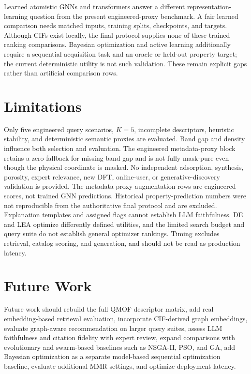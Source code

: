 \documentclass[12pt,a4paper]{article}
\begin{document}
Learned atomistic GNNs and transformers answer a different representation-learning question from the present engineered-proxy benchmark. A fair learned comparison needs matched inputs, training splits, checkpoints, and targets. Although CIFs exist locally, the final protocol supplies none of these trained ranking comparisons. Bayesian optimization and active learning additionally require a sequential acquisition task and an oracle or held-out property target; the current deterministic utility is not such validation. These remain explicit gaps rather than artificial comparison rows.

\section{Limitations}
\label{sec:limitations}

Only five engineered query scenarios, $K=5$, incomplete descriptors, heuristic stability, and deterministic semantic proxies are evaluated. Band gap and density influence both selection and evaluation. The engineered metadata-proxy block retains a zero fallback for missing band gap and is not fully mask-pure even though the physical coordinate is masked. No independent adsorption, synthesis, porosity, expert relevance, new DFT, online-user, or generative-discovery validation is provided. The metadata-proxy augmentation rows are engineered scores, not trained GNN predictions. Historical property-prediction numbers were not reproducible from the authoritative final protocol and are excluded. Explanation templates and assigned flags cannot establish LLM faithfulness. DE and LEA optimize differently defined utilities, and the limited search budget and query suite do not establish general optimizer rankings. Timing excludes retrieval, catalog scoring, and generation, and should not be read as production latency.

\section{Future Work}
\label{sec:future}

Future work should rebuild the full QMOF descriptor matrix, add real embedding-based retrieval evaluation, incorporate CIF-derived graph embeddings, evaluate graph-aware recommendation on larger query suites, assess LLM faithfulness and citation fidelity with expert review, expand comparisons with evolutionary and swarm-based baselines such as NSGA-II, PSO, and GA, add Bayesian optimization as a separate model-based sequential optimization baseline, evaluate additional MMR settings, and optimize deployment latency.
\end{document}
